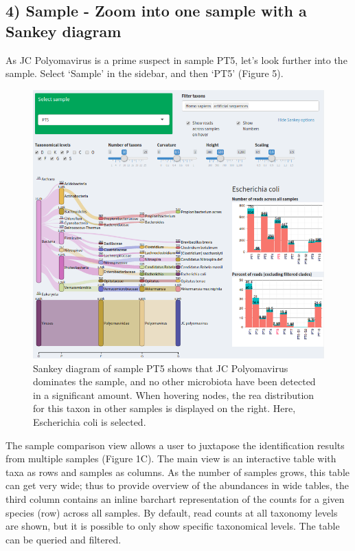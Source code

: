 \documentclass[]{article}
\begin{document}
\subsection{4) Sample - Zoom into one sample with a Sankey
diagram}\label{sample---zoom-into-one-sample-with-a-sankey-diagram}

As JC Polyomavirus is a prime suspect in sample PT5, let's look further
into the sample. Select `Sample' in the sidebar, and then `PT5' (Figure
5).

\begin{figure}[htbp]
\centering
\includegraphics{flow-pt5-2.png}
\caption{Sankey diagram of sample PT5 shows that JC Polyomavirus
dominates the sample, and no other microbiota have been detected in a
significant amount. When hovering nodes, the rea distribution for this
taxon in other samples is displayed on the right. Here, Escherichia coli
is selected.}
\end{figure}

The sample comparison view allows a user to juxtapose the identification
results from multiple samples (Figure 1C). The main view is an
interactive table with taxa as rows and samples as columns. As the
number of samples grows, this table can get very wide; thus to provide
overview of the abundances in wide tables, the third column contains an
inline barchart representation of the counts for a given species (row)
across all samples. By default, read counts at all taxonomy levels are
shown, but it is possible to only show specific taxonomical levels. The
table can be queried and filtered.
\end{document}
